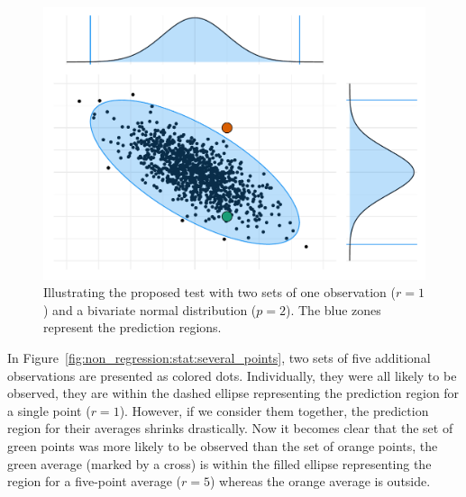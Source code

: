             \begin{figure}[htpb]
                \centering
                \includegraphics[width=0.9\linewidth]{img/experiment/non_regression/statistics/single_point.pdf}
                \caption{Illustrating the proposed test with two sets of one observation (\(r=1\)) and a bivariate normal
                distribution (\(p=2\)). The blue zones represent the  prediction regions.}%
                \label{fig:non_regression:stat:single_point}
            \end{figure}

            In Figure~\ref{fig:non_regression:stat:several_points}, two sets of five additional observations are presented
            as colored dots. Individually, they were all likely to be observed, they are within the dashed ellipse
            representing the  prediction region for a single point (\ie \(r=1\)). However, if we
            consider them together, the prediction region for their averages shrinks drastically. Now it becomes clear that
            the set of green points was more likely to be observed than the set of orange points, the green average (marked
            by a cross) is within the filled ellipse representing the  region for a five-point average
            (\ie \(r=5\)) whereas the orange average is outside.

